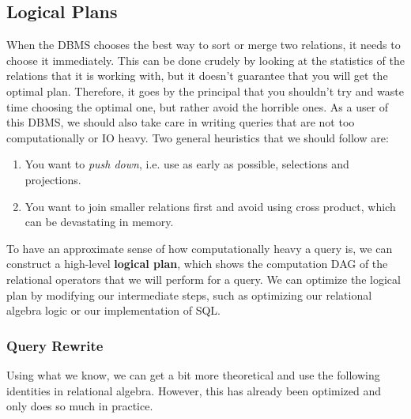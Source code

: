 \documentclass{article}
\begin{document}
  \subsection{Logical Plans}

      When the DBMS chooses the best way to sort or merge two relations, it needs to choose it immediately. This can be done crudely by looking at the statistics of the relations that it is working with, but it doesn't guarantee that you will get the optimal plan. Therefore, it goes by the principal that you shouldn't try and waste time choosing the optimal one, but rather avoid the horrible ones. As a user of this DBMS, we should also take care in writing queries that are not too computationally or IO heavy. Two general heuristics that we should follow are: 
      \begin{enumerate}
        \item You want to \textit{push down}, i.e. use as early as possible, selections and projections. 
        \item You want to join smaller relations first and avoid using cross product, which can be devastating in memory. 
      \end{enumerate}

      \begin{definition}
        To have an approximate sense of how computationally heavy a query is, we can construct a high-level \textbf{logical plan}, which shows the computation DAG of the relational operators that we will perform for a query. We can optimize the logical plan by modifying our intermediate steps, such as optimizing our relational algebra logic or our implementation of SQL. 
      \end{definition}

    \subsubsection{Query Rewrite}

      Using what we know, we can get a bit more theoretical and use the following identities in relational algebra. However, this has already been optimized and only does so much in practice. 
\end{document}
